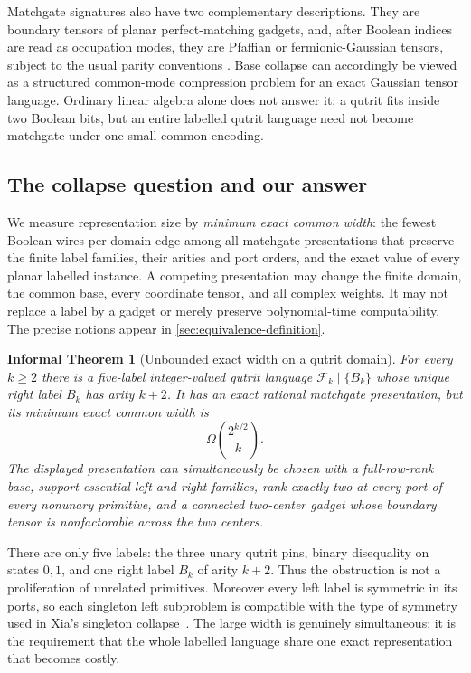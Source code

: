\documentclass[11pt]{article}
\newtheorem*{informaltheorem}{Informal Theorem}
\theoremstyle{definition}
\theoremstyle{remark}
\newcommand{\cF}{\mathcal F}
\begin{document}
Matchgate signatures also have two complementary descriptions.  They are
boundary tensors of planar perfect-matching gadgets, and, after Boolean
indices are read as occupation modes, they are Pfaffian or
fermionic-Gaussian tensors, subject to the usual parity conventions
\cite{Bravyi2009,JozsaMiyake2008}.  Base collapse can accordingly be viewed
as a structured common-mode compression problem for an exact Gaussian
tensor language.  Ordinary linear algebra alone does not answer it: a
qutrit fits inside two Boolean bits, but an entire labelled qutrit language
need not become matchgate under one small common encoding.

\subsection{The collapse question and our answer}

We measure representation size by \emph{minimum exact common width}: the
fewest Boolean wires per domain edge among all matchgate presentations that
preserve the finite label families, their arities and port orders, and the
exact value of every planar labelled instance.  A competing presentation may
change the finite domain, the common base, every coordinate tensor, and all
complex weights.  It may not replace a label by a gadget or merely preserve
polynomial-time computability.  The precise notions appear in
\cref{sec:equivalence-definition}.

\begin{informaltheorem}[Unbounded exact width on a qutrit domain]
For every $k\ge2$ there is a five-label integer-valued qutrit language
$\cF_k\mid\{B_k\}$ whose unique right label $B_k$ has arity $k+2$.  It has
an exact rational matchgate presentation, but its minimum exact common width
is
\[
  \Omega\!\left(\frac{2^{k/2}}{k}\right).
\]
The displayed presentation can simultaneously be chosen with a full-row-rank
base, support-essential left and right families, rank exactly two at every
port of every nonunary primitive, and a connected two-center gadget whose
boundary tensor is nonfactorable across the two centers.
\end{informaltheorem}

There are only five labels: the three unary qutrit pins, binary disequality
on states $0,1$, and one right label $B_k$ of arity $k+2$.  Thus the
obstruction is not a proliferation of unrelated primitives.  Moreover every
left label is symmetric in its ports, so each singleton left subproblem is
compatible with the type of symmetry used in Xia's singleton
collapse~\cite[Theorem~5.3]{Xia2016}.  The
large width is genuinely simultaneous: it is the requirement that the whole
labelled language share one exact representation that becomes costly.
\end{document}
